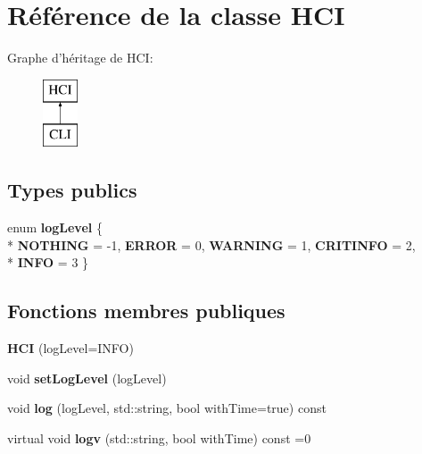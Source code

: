\hypertarget{classHCI}{\section{Référence de la classe H\-C\-I}
\label{classHCI}
}
Graphe d'héritage de H\-C\-I\-:\begin{figure}[H]
\begin{center}
\leavevmode
\includegraphics[height=2.000000cm]{classHCI}
\end{center}
\end{figure}
\subsection*{Types publics}
\begin{DoxyCompactItemize}
\item 
enum {\bfseries log\-Level} \{ \\*
{\bfseries N\-O\-T\-H\-I\-N\-G} =  -\/1, 
{\bfseries E\-R\-R\-O\-R} =  0, 
{\bfseries W\-A\-R\-N\-I\-N\-G} =  1, 
{\bfseries C\-R\-I\-T\-I\-N\-F\-O} =  2, 
\\*
{\bfseries I\-N\-F\-O} =  3
 \}
\end{DoxyCompactItemize}
\subsection*{Fonctions membres publiques}
\begin{DoxyCompactItemize}
\item 
\hypertarget{classHCI_a3cac51013396bb8a130298a04b966856}{{\bfseries H\-C\-I} (log\-Level=I\-N\-F\-O)}\label{classHCI_a3cac51013396bb8a130298a04b966856}

\item 
\hypertarget{classHCI_ab30b1bd8e7b5ddb8764128e9da1b3062}{void {\bfseries set\-Log\-Level} (log\-Level)}\label{classHCI_ab30b1bd8e7b5ddb8764128e9da1b3062}

\item 
\hypertarget{classHCI_a3ba0116597c8a43a7ceac9639150e6c1}{void {\bfseries log} (log\-Level, std\-::string, bool with\-Time=true) const }\label{classHCI_a3ba0116597c8a43a7ceac9639150e6c1}

\item 
\hypertarget{classHCI_a63e5f2061611136d467cda53e4636713}{virtual void {\bfseries logv} (std\-::string, bool with\-Time) const =0}\label{classHCI_a63e5f2061611136d467cda53e4636713}

\end{DoxyCompactItemize}
